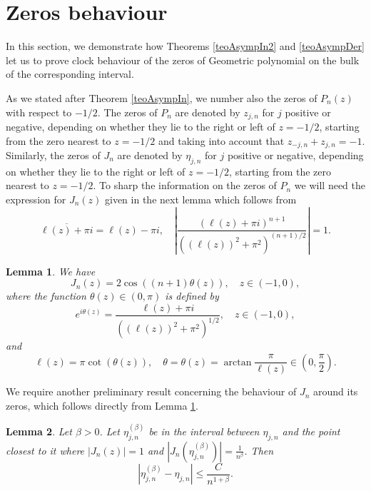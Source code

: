 \documentclass[11pt]{article}
\newtheorem{lemma}{Lemma}
\begin{document}
\section{Zeros behaviour}\label{sec:Zeros}



In this section, we demonstrate how Theorems \ref{teoAsympIn2} and \ref{teoAsympDer} let us to prove clock behaviour of the zeros of Geometric polynomial on the bulk of the corresponding interval.

As we stated after Theorem \ref{teoAsympIn}, we number also the zeros of $P_n(z)$ with respect to $-1/2$. The zeros of $P_n$ are denoted by $z_{j,n}$ for $j$ positive or negative, depending on whether they lie to the right or left of $z = -1/2$, starting from the zero nearest to $z = -1/2$ and taking into account that $z_{-j,n}+z_{j,n}=-1$. Similarly, the zeros of $J_n$ are denoted by $\eta_{j,n}$ for $j$ positive or negative, depending on whether they lie to the right or left of $z = -1/2$, starting from the zero nearest to $z = -1/2$. To sharp the information on the zeros of $P_n$ we will need the expression for $J_n(z)$ given in the next lemma which follows from 
\[
\overline{\ell(z)+\pi i}=\ell(z)-\pi i,\quad \left|\frac{(\ell(z)+\pi i)^{n+1}}{((\ell(z))^2+\pi^2)^{(n+1)/2}}\right|=1.
\]

\begin{lemma} \label{lemExpCosJn}We have
\[
J_n(z)=2\cos((n+1)\theta(z)),\quad z\in(-1,0),
\]
where the function $\theta(z)\in(0,\pi)$ is defined by
\[
e^{i\theta(z)}=\frac{\ell(z)+\pi i}{\left((\ell(z))^2+\pi^2\right)^{1/2}},\quad z\in (-1,0),
\]
and
\[
\ell(z)=\pi \cot(\theta(z)),\quad \theta=\theta(z)=\arctan\frac{\pi}{\ell(z)}\in(0,\frac{\pi}2).
\]
\end{lemma}
We require another preliminary result concerning the behaviour of $J_n$ around its zeros, which follows directly from Lemma \ref{lemExpCosJn}.

\begin{lemma} \label{levelSetJ_n} Let $\beta>0$. Let $\eta_{j,n}^{(\beta)}$ be in the interval between $\eta_{j,n}$ and the point closest to it where $|J_n(z)|=1$ and $|J_n(\eta_{j,n}^{(\beta)})|=\frac{1}{n^{\beta}}$. Then
\[
 |\eta_{j,n}^{(\beta)}-\eta_{j,n}|\leq \frac{C}{n^{1+\beta}}.
\]
\end{lemma}
\end{document}
